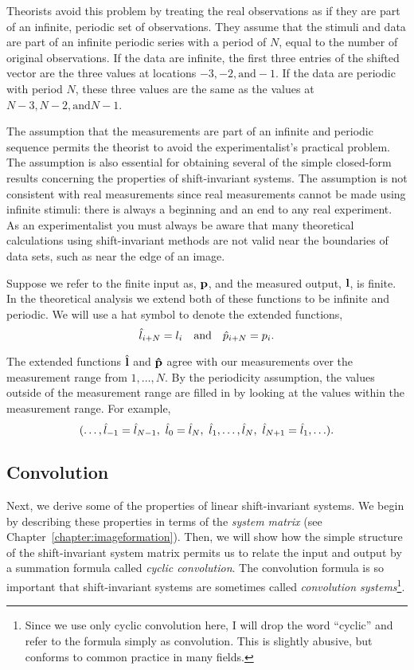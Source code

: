 Theorists avoid this problem by treating the real observations as if
they are part of an infinite, periodic set of observations.  They
assume that the stimuli and data are part of an infinite periodic
series with a period of $N$, equal to the number of original
observations.  If the data are infinite, the first three entries
of the shifted vector are the three values at locations $-3, -2,
\mbox{and} -1$.  If the data are periodic with period $N$, these
three values are the same as the values at $N-3, N-2, \mbox{and} N-1$.

The assumption that the measurements are part of an infinite and periodic
sequence permits the theorist to avoid the experimentalist's
practical problem.  The assumption is also essential for obtaining
several of the simple closed-form results concerning the properties
of shift-invariant systems.  The assumption is not consistent with
real measurements since real measurements cannot be made using
infinite stimuli: there is always a beginning and an end to any real
experiment.  As an experimentalist you must always be aware that many
theoretical calculations using shift-invariant methods are not valid
near the boundaries of data sets, such as near the edge of an image.

Suppose we refer to the finite input as, $\mbox {$\bf p$}$, and the measured
output, $\mbox {$\bf l$}$, is finite.  In the theoretical analysis we extend
both of these functions to be infinite and periodic.  We will use a
hat symbol to denote the extended functions,
\begin{equation}
\label{f1:extend}
\mbox {$\hat{l}_{i+N}$} = \mbox{$l_{i}$}
  ~~~\mbox{and}~~~
\mbox{$\hat{p}_{i+N}$}=\mbox{$p_{i}$} .
\end{equation}

The extended functions $\mbox {$\hat{\bf l}$}{}$ and $\mbox {$\bf \hat{p}$}$ agree with our
measurements over the measurement range from $1, \ldots, N$.  By the
periodicity assumption, the values outside of the measurement range
are filled in by looking at the values within the measurement range.
For example,
\[
(\ldots, 
 \mbox {$\hat{l}_{-1}$} = \mbox {$\hat{l}_{N-1}$},
 ~\mbox {$\hat{l}_{0}$} = \mbox {$\hat{l}_{N}$},
 ~\mbox {$\hat{l}_{1}$},
 \ldots,
 \mbox {$\hat{l}_{N}$},~
 \mbox {$\hat{l}_{N+1}$} = \mbox {$\hat{l}_{1}$}, 
 \ldots ) .
\]

\subsection*{Convolution}
Next, we derive some of the properties of linear shift-invariant
systems.  We begin by describing these properties in terms of the {\em
system matrix} (see Chapter~\ref{chapter:imageformation}).  Then, we
will show how the simple structure of the shift-invariant system
matrix permits us to relate the input and output by a summation
formula called {\em cyclic convolution}.  The convolution formula is
so important that shift-invariant systems are sometimes called {\em
convolution systems}\footnote{Since we use only cyclic convolution
here, I will drop the word ``cyclic'' and refer to the formula simply
as convolution.  This is slightly abusive, but conforms to common
practice in many fields.}.

